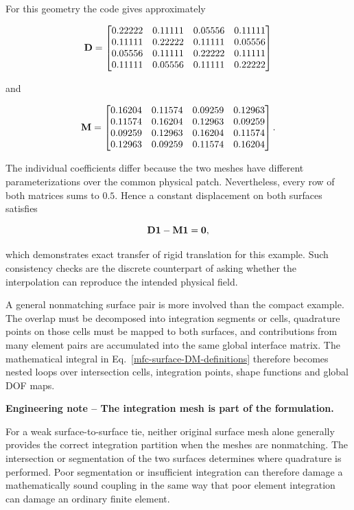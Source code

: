 For this geometry the code gives approximately

\begin{equation}
\mathbf{D}=\begin{bmatrix}
0.22222&0.11111&0.05556&0.11111\\
0.11111&0.22222&0.11111&0.05556\\
0.05556&0.11111&0.22222&0.11111\\
0.11111&0.05556&0.11111&0.22222
\end{bmatrix}
\end{equation}

and

\begin{equation}
\mathbf{M}=\begin{bmatrix}
0.16204&0.11574&0.09259&0.12963\\
0.11574&0.16204&0.12963&0.09259\\
0.09259&0.12963&0.16204&0.11574\\
0.12963&0.09259&0.11574&0.16204
\end{bmatrix}.
\end{equation}

The individual coefficients differ because the two meshes have different
parameterizations over the common physical patch. Nevertheless, every row of
both matrices sums to $0.5$. Hence a constant displacement on both surfaces
satisfies

\begin{equation}
    \mathbf{D}\mathbf{1}-\mathbf{M}\mathbf{1}=\mathbf{0},
\end{equation}

which demonstrates exact transfer of rigid translation for this example. Such
consistency checks are the discrete counterpart of asking whether the
interpolation can reproduce the intended physical field.

A general nonmatching surface pair is more involved than the compact example.
The overlap must be decomposed into integration segments or cells, quadrature
points on those cells must be mapped to both surfaces, and contributions from
many element pairs are accumulated into the same global interface matrix. The
mathematical integral in Eq.~\eqref{mfc-surface-DM-definitions} therefore becomes
nested loops over intersection cells, integration points, shape functions and
global DOF maps.

\begin{bbox}
\textbf{Engineering note -- The integration mesh is part of the formulation.}

For a weak surface-to-surface tie, neither original surface mesh alone generally
provides the correct integration partition when the meshes are nonmatching. The
intersection or segmentation of the two surfaces determines where quadrature is
performed. Poor segmentation or insufficient integration can therefore damage a
mathematically sound coupling in the same way that poor element integration can
damage an ordinary finite element.
\end{bbox}

